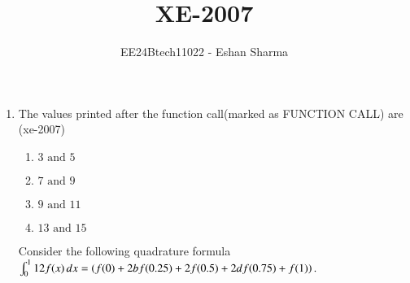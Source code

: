 \documentclass[journal,12pt,onecolumn]{IEEEtran}
\theoremstyle{remark}
\begin{document}

\vspace{3cm}

\title{XE-2007}
\author{EE24Btech11022 - Eshan Sharma}
\maketitle

\renewcommand{\thefigure}{\theenumi}
\renewcommand{\thetable}{\theenumi}



\begin{enumerate}
	Consider the following C program segment
	
	\lstset{language=C, frame=none, basicstyle=\ttfamily}
	\begin{lstlisting}
	#include <stdio.h>
	void print_mat (int [][3]);
	void main(){
		int i,j,sum=0;
		int m[3][3] = {{1,3,5},{7,9,11},{13,15,17}};
		for(i=0;i<3;i++){
			for(j=2;j>1;j--){
				sum += m[i][j]*m[i][j-1];	
			}
		}
		printf("%d",sum);
		print_mat(m);  // FUNCTION CALL	
	}
		
	void print_mat(int mat[][3]){
		int(*p)[3]=&mat[1];
		printf("%d and %d", (*p)[1], (*p)[2]);
	}
	\end{lstlisting}
    \item The values printed after the function call(marked as FUNCTION CALL) are
    \hfill{(xe-2007)}
    \begin{multicols}{4}
    \begin{enumerate}
    \item $3 \text{ and } 5$
    \item $7 \text{ and } 9$
    \item $9 \text{ and } 11$
    \item $13 \text{ and } 15$
    \end{enumerate}
    \end{multicols}
    
	Consider the following quadrature formula \\
	$\int_0^1 12f(x) \, dx = \left(f(0)+2bf(0.25)+2f(0.5)+2df(0.75)+f(1)\right).$\\
    

\end{enumerate}
\end{document}
